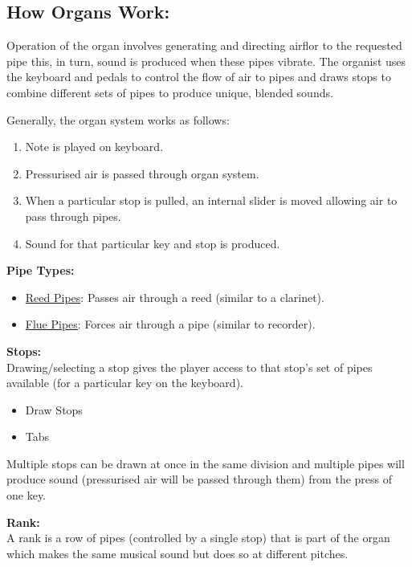\noindent \subsection{How Organs Work:}
\hspace{0.5cm} Operation of the organ involves generating and directing airflor to the requested pipe this, in turn, sound is produced when these pipes vibrate. The organist uses the keyboard and pedals to control the flow of air to pipes and draws stops to combine different sets of pipes to produce unique, blended sounds.  \cite{organvideo}

\noindent Generally, the organ system works as follows:
\begin{enumerate}
\item Note is played on keyboard.
\item Pressurised air is passed through organ system.
\item When a particular stop is pulled, an internal slider is moved allowing air to pass through pipes.
\item Sound for that particular key and stop is produced.
\end{enumerate}

\noindent \textbf{Pipe Types:}
\begin{itemize}
\item \underline{Reed Pipes}: Passes air through a reed (similar to a clarinet).
\item \underline{Flue Pipes}: Forces air through a pipe (similar to recorder).
\end{itemize}
\cite{organvideo}

\noindent \textbf{Stops:}
\\ \hspace*{0.5cm}Drawing/selecting a stop gives the player access to that stop's set of pipes available (for a particular key on the keyboard). 
\begin{itemize}
\item Draw Stops
\item Tabs
\end{itemize}

Multiple stops can be drawn at once in the same division and multiple pipes will produce sound (pressurised air will be passed through them) from the press of one key. \cite{organvideo}

\medskip
\noindent \textbf{Rank:}
\\ \hspace*{0.5cm} A rank is a row of pipes (controlled by a single stop) that is part of the organ which makes the same musical sound but does so at different pitches. 

